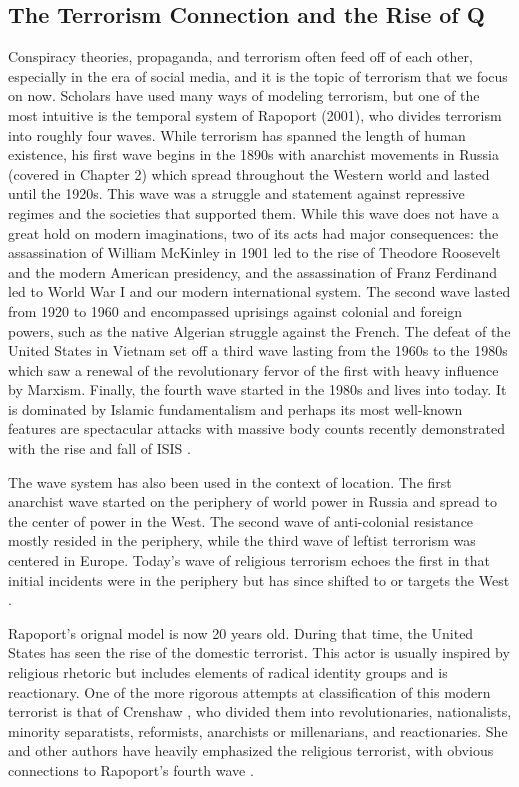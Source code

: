 \subsection{The Terrorism Connection and the Rise of Q}

Conspiracy theories, propaganda, and terrorism often feed off of each other, especially in the era of social media, and it is the topic of terrorism that we focus on now.
Scholars have used many ways of modeling terrorism, but one of the most intuitive is the temporal system of Rapoport (2001), who divides terrorism into roughly four waves.
While terrorism has spanned the length of human existence, his first wave begins in the 1890s with anarchist movements in Russia (covered in Chapter 2) which spread throughout the Western world and lasted until the 1920s.
This wave was a struggle and statement against repressive regimes and the societies that supported them.
While this wave does not have a great hold on modern imaginations, two of its acts had major consequences: the assassination of William McKinley in 1901 led to the rise of Theodore Roosevelt and the modern American presidency, and the assassination of Franz Ferdinand led to World War I and our modern international system.
The second wave lasted from 1920 to 1960 and encompassed uprisings against colonial and foreign powers, such as the native Algerian struggle against the French.
The defeat of the United States in Vietnam set off a third wave lasting from the 1960s to the 1980s which saw a renewal of the revolutionary fervor of the first with heavy influence by Marxism.
Finally, the fourth wave started in the 1980s and lives into today.
It is dominated by Islamic fundamentalism and perhaps its most well-known features are spectacular attacks with massive body counts recently demonstrated with the rise and fall of ISIS \cite{rapoport2001}.

The wave system has also been used in the context of location.
The first anarchist wave started on the periphery of world power in Russia and spread to the center of power in the West.
The second wave of anti-colonial resistance mostly resided in the 
periphery, while the third wave of leftist terrorism was centered in Europe. Today’s wave of religious terrorism echoes the first in that initial incidents were in the periphery but has since shifted to or targets the West \cite{lizardo2003}.

Rapoport's orignal model is now 20 years old.
During that time, the United States has seen the rise of the domestic terrorist.
This actor is usually inspired by religious rhetoric but includes elements of radical identity groups and is reactionary.
One of the more rigorous attempts at classification of this modern terrorist is that of Crenshaw \citeyear{crenshaw1981}, who divided them into revolutionaries, nationalists, minority separatists, reformists, anarchists or millenarians, and reactionaries.
She and other authors have heavily emphasized the religious terrorist, with obvious connections to Rapoport’s fourth wave \cite{crenshaw2000}.


